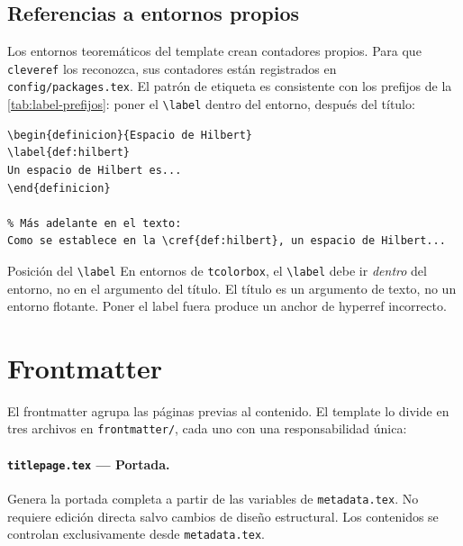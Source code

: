 \subsection{Referencias a entornos propios}
\label{subsec:cref-entornos}

Los entornos teoremáticos del template crean contadores propios. Para que
\texttt{cleveref} los reconozca, sus contadores están registrados en
\texttt{config/packages.tex}. El patrón de etiqueta es consistente con
los prefijos de la \cref{tab:label-prefijos}: poner el
\texttt{\textbackslash label} dentro del entorno, después del título:

\begin{lstlisting}[style=latex, frame=none, numbers=none]
\begin{definicion}{Espacio de Hilbert}
\label{def:hilbert}
Un espacio de Hilbert es...
\end{definicion}

% Más adelante en el texto:
Como se establece en la \cref{def:hilbert}, un espacio de Hilbert...
\end{lstlisting}

\begin{observacion}{Posición del \texttt{\textbackslash label}}
En entornos de \texttt{tcolorbox}, el \texttt{\textbackslash label} debe
ir \textit{dentro} del entorno, no en el argumento del título. El título
es un argumento de texto, no un entorno flotante. Poner el label fuera
produce un anchor de hyperref incorrecto.
\end{observacion}

\section{Frontmatter}
\label{sec:frontmatter}

El frontmatter agrupa las páginas previas al contenido. El template lo
divide en tres archivos en \texttt{frontmatter/}, cada uno con una
responsabilidad única:

\paragraph{\texttt{titlepage.tex} --- Portada.}
Genera la portada completa a partir de las variables de \texttt{metadata.tex}.
No requiere edición directa salvo cambios de diseño estructural. Los contenidos
se controlan exclusivamente desde \texttt{metadata.tex}.


